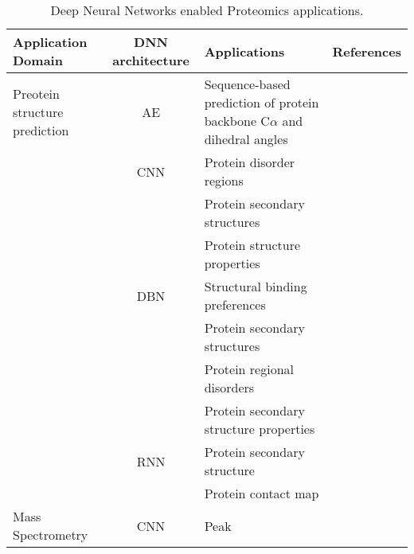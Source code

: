 \begin{table}[h!]
\centering
\begin{tabular}{|| l | c | l | l ||}
    \hline
    Application Domain & DNN architecture & Applications & References\\
    \hline \hline
    Preotein structure prediction & AE & Sequence-based prediction of protein backbone C$\alpha$ and dihedral angles & \\
    & CNN & Protein disorder regions & \\
    &     & Protein secondary structures & \\
    &     & Protein structure properties & \\
    & DBN & Structural binding preferences & \\
    &     & Protein secondary structures & \\
    &     & Protein regional disorders & \\
    &     & Protein secondary structure properties & \\
    & RNN & Protein secondary structure & \\
    &     & Protein contact map & \\
    \hline 
    Mass Spectrometry & CNN & Peak& \\
    \hline 
    
    \hline \hline
\end{tabular}
\caption{Deep Neural Networks enabled Proteomics applications.}
\label{tab:PS-DNN}
\end{table}